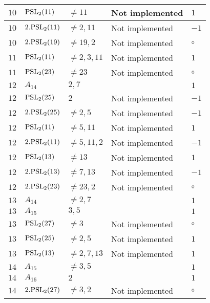 \documentclass[a4paper, 11pt]{article}
\begin{document}
\begin{longtable}{lllll}
        $ 10 $ & $ {\rm PSL}_{2}(11) $ & $ \neq 11 $ & Not implemented & $ 1  $ \\ \hline
        $ 10 $ & $ 2.{\rm PSL}_{2}(11) $ & $ \neq 2, 11 $ & Not implemented & $ -1  $ \\ \hline
        $ 10 $ & $ 2.{\rm PSL}_{2}(19) $ & $ \neq 19, 2 $ & Not implemented & $\circ$ \\ \hline
        $ 11 $ & $ {\rm PSL}_{2}(11) $ & $ \neq 2, 3, 11 $ & Not implemented & $ 1  $ \\ \hline
        $ 11 $ & $ {\rm PSL}_{2}(23) $ & $ \neq 23 $ & Not implemented & $\circ$ \\ \hline
        $ 12 $ & $ A_{14} $ & $ 2, 7 $ & $ ~ $ & $ 1  $ \\ \hline
        $ 12 $ & $ {\rm PSL}_{2}(25) $ & $ 2 $ & Not implemented & $ -1  $ \\ \hline
        $ 12 $ & $ 2.{\rm PSL}_{2}(25) $ & $ \neq 2, 5 $ & Not implemented & $ -1  $ \\ \hline
        $ 12 $ & $ {\rm PSL}_{2}(11) $ & $ \neq 5, 11 $ & Not implemented & $ 1  $ \\ \hline
        $ 12 $ & $ 2.{\rm PSL}_{2}(11) $ & $ \neq 5, 11, 2 $ & Not implemented & $ -1  $ \\ \hline
        $ 12 $ & $ {\rm PSL}_{2}(13) $ & $ \neq 13 $ & Not implemented & $ 1  $ \\ \hline
        $ 12 $ & $ 2.{\rm PSL}_{2}(13) $ & $ \neq 7, 13 $ & Not implemented & $ -1  $ \\ \hline
        $ 12 $ & $ 2.{\rm PSL}_{2}(23) $ & $ \neq 23, 2 $ & Not implemented & $\circ$ \\ \hline
        $ 13 $ & $ A_{14} $ & $ \neq 2, 7 $ & $ ~ $ & $ 1  $ \\ \hline
        $ 13 $ & $ A_{15} $ & $ 3, 5 $ & $ ~ $ & $ 1  $ \\ \hline
        $ 13 $ & $ {\rm PSL}_{2}(27) $ & $ \neq 3 $ & Not implemented & $\circ$ \\ \hline
        $ 13 $ & $ {\rm PSL}_{2}(25) $ & $ \neq 2, 5 $ & Not implemented & $ 1  $ \\ \hline
        $ 13 $ & $ {\rm PSL}_{2}(13) $ & $ \neq 2, 7, 13 $ & Not implemented & $ 1  $ \\ \hline
        $ 14 $ & $ A_{15} $ & $ \neq 3, 5 $ & $ ~ $ & $ 1  $ \\ \hline
        $ 14 $ & $ A_{16} $ & $ 2 $ & $ ~ $ & $ 1  $ \\ \hline
        $ 14 $ & $ 2.{\rm PSL}_{2}(27) $ & $ \neq 3, 2 $ & Not implemented & $\circ$ \\ \hline

\end{longtable}
\end{document}

